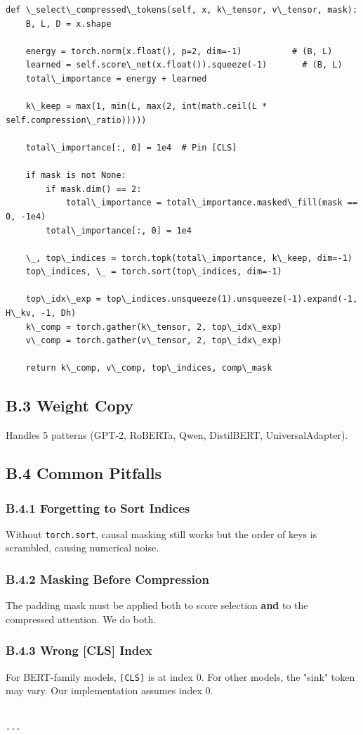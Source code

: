 \begin{lstlisting}
def \_select\_compressed\_tokens(self, x, k\_tensor, v\_tensor, mask):
    B, L, D = x.shape
    
    energy = torch.norm(x.float(), p=2, dim=-1)          # (B, L)
    learned = self.score\_net(x.float()).squeeze(-1)       # (B, L)
    total\_importance = energy + learned
    
    k\_keep = max(1, min(L, max(2, int(math.ceil(L * self.compression\_ratio)))))
    
    total\_importance[:, 0] = 1e4  # Pin [CLS]
    
    if mask is not None:
        if mask.dim() == 2:
            total\_importance = total\_importance.masked\_fill(mask == 0, -1e4)
        total\_importance[:, 0] = 1e4
    
    \_, top\_indices = torch.topk(total\_importance, k\_keep, dim=-1)
    top\_indices, \_ = torch.sort(top\_indices, dim=-1)
    
    top\_idx\_exp = top\_indices.unsqueeze(1).unsqueeze(-1).expand(-1, H\_kv, -1, Dh)
    k\_comp = torch.gather(k\_tensor, 2, top\_idx\_exp)
    v\_comp = torch.gather(v\_tensor, 2, top\_idx\_exp)
    
    return k\_comp, v\_comp, top\_indices, comp\_mask
\end{lstlisting}

\subsection{B.3 Weight Copy}

Handles 5 patterns (GPT-2, RoBERTa, Qwen, DistilBERT, UniversalAdapter).

\subsection{B.4 Common Pitfalls}

\subsubsection{B.4.1 Forgetting to Sort Indices}

Without \texttt{torch.sort}, causal masking still works but the order of keys is 
scrambled, causing numerical noise.

\subsubsection{B.4.2 Masking Before Compression}

The padding mask must be applied both to score selection \textbf{and} to the 
compressed attention. We do both.

\subsubsection{B.4.3 Wrong [CLS] Index}

For BERT-family models, \texttt{[CLS]} is at index 0. For other models, the "sink" 
token may vary. Our implementation assumes index 0.
\begin{lstlisting}

---
\end{lstlisting}